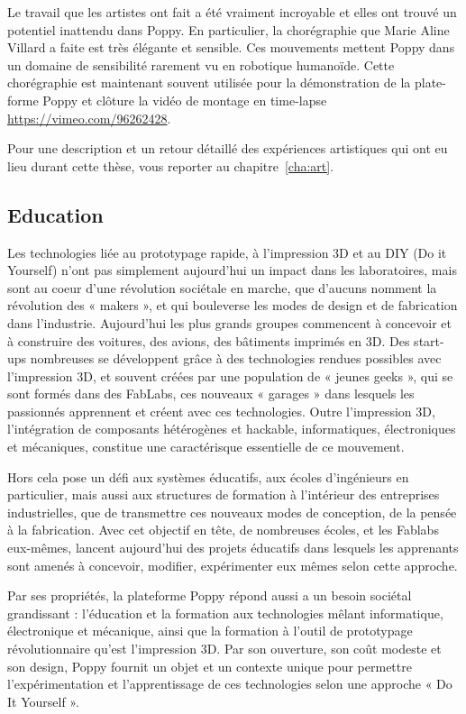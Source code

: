 Le travail que les artistes ont fait a été vraiment incroyable et elles ont trouvé un potentiel inattendu dans Poppy. En particulier, la chorégraphie que Marie Aline Villard a faite est très élégante et sensible. Ces mouvements mettent Poppy dans un domaine de sensibilité rarement vu en robotique humanoïde. Cette chorégraphie est maintenant souvent utilisée pour la démonstration de la plate-forme Poppy et clôture la vidéo de montage en time-lapse \url{https://vimeo.com/96262428}.

Pour une description et un retour détaillé des expériences artistiques qui ont eu lieu durant cette thèse, vous reporter au chapitre~\ref{cha:art}.

\subsection*{Education} %
Les technologies liée au prototypage rapide, à l’impression 3D et au DIY (Do it Yourself) n’ont pas simplement aujourd’hui un impact dans les laboratoires, mais sont au coeur d’une révolution sociétale en marche, que d’aucuns nomment la révolution des « makers », et qui bouleverse les modes de design et de fabrication dans l’industrie. Aujourd’hui les plus grands groupes commencent à concevoir et à construire des voitures, des avions, des bâtiments imprimés en 3D. Des start-ups nombreuses se développent grâce à des technologies rendues possibles avec l’impression 3D, et souvent créées par une population de « jeunes geeks », qui se sont formés dans des FabLabs, ces nouveaux « garages » dans lesquels les passionnés apprennent et créent avec ces technologies. Outre l’impression 3D, l’intégration de composants hétérogènes et hackable, informatiques, électroniques et mécaniques, constitue une caractérisque essentielle de ce mouvement.

Hors cela pose un défi aux systèmes éducatifs, aux écoles d’ingénieurs en particulier, mais aussi aux structures de formation à l’intérieur des entreprises industrielles, que de transmettre ces nouveaux modes de conception, de la pensée à la fabrication. Avec cet objectif en tête, de nombreuses écoles, et les Fablabs eux-mêmes, lancent aujourd’hui des projets éducatifs dans lesquels les apprenants sont amenés à concevoir, modifier, expérimenter eux mêmes selon cette approche.

Par ses propriétés, la plateforme Poppy répond aussi a un besoin sociétal grandissant : l’éducation et la formation aux technologies mêlant informatique, électronique et mécanique, ainsi que la formation à l’outil de prototypage révolutionnaire qu’est l’impression 3D. Par son ouverture, son coût modeste et son design, Poppy fournit un objet et un contexte unique pour permettre l’expérimentation et l’apprentissage de ces technologies selon une approche « Do It Yourself ».

